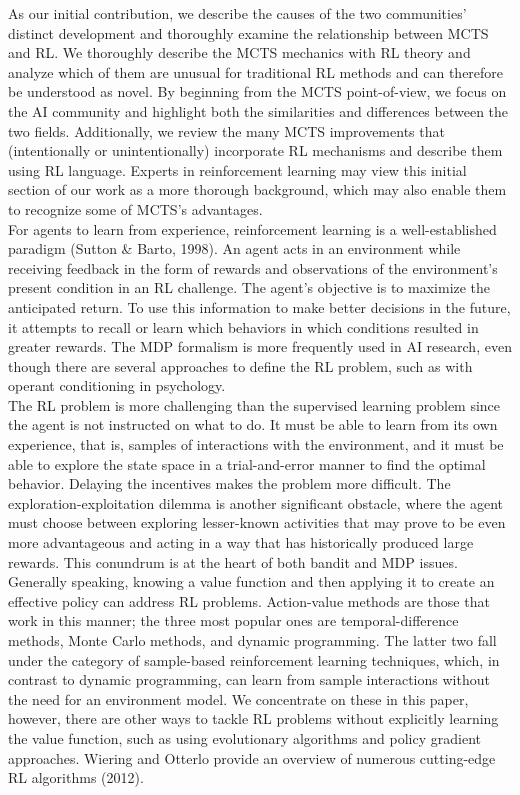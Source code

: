 \documentclass[a4paper,11pt,onecolumn]{article}
\begin{document}
As our initial contribution, we describe the causes of the two communities' distinct development and thoroughly examine the relationship between MCTS and RL. We thoroughly describe the MCTS mechanics with RL theory and analyze which of them are unusual for traditional RL methods and can therefore be understood as novel. By beginning from the MCTS point-of-view, we focus on the AI community and highlight both the similarities and differences between the two fields. Additionally, we review the many MCTS improvements that (intentionally or unintentionally) incorporate RL mechanisms and describe them using RL language. Experts in reinforcement learning may view this initial section of our work as a more thorough background, which may also enable them to recognize some of MCTS's advantages.\\
For agents to learn from experience, reinforcement learning is a well-established paradigm (Sutton & Barto, 1998). An agent acts in an environment while receiving feedback in the form of rewards and observations of the environment's present condition in an RL challenge. The agent's objective is to maximize the anticipated return. To use this information to make better decisions in the future, it attempts to recall or learn which behaviors in which conditions resulted in greater rewards. The MDP formalism is more frequently used in AI research, even though there are several approaches to define the RL problem, such as with operant conditioning in psychology.\\
The RL problem is more challenging than the supervised learning problem since the agent is not instructed on what to do. It must be able to learn from its own experience, that is, samples of interactions with the environment, and it must be able to explore the state space in a trial-and-error manner to find the optimal behavior. Delaying the incentives makes the problem more difficult. The exploration-exploitation dilemma is another significant obstacle, where the agent must choose between exploring lesser-known activities that may prove to be even more advantageous and acting in a way that has historically produced large rewards. This conundrum is at the heart of both bandit and MDP issues.\\
Generally speaking, knowing a value function and then applying it to create an effective policy can address RL problems. Action-value methods are those that work in this manner; the three most popular ones are temporal-difference methods, Monte Carlo methods, and dynamic programming. The latter two fall under the category of sample-based reinforcement learning techniques, which, in contrast to dynamic programming, can learn from sample interactions without the need for an environment model. We concentrate on these in this paper, however, there are other ways to tackle RL problems without explicitly learning the value function, such as using evolutionary algorithms and policy gradient approaches. Wiering and Otterlo provide an overview of numerous cutting-edge RL algorithms (2012).
\end{document}
